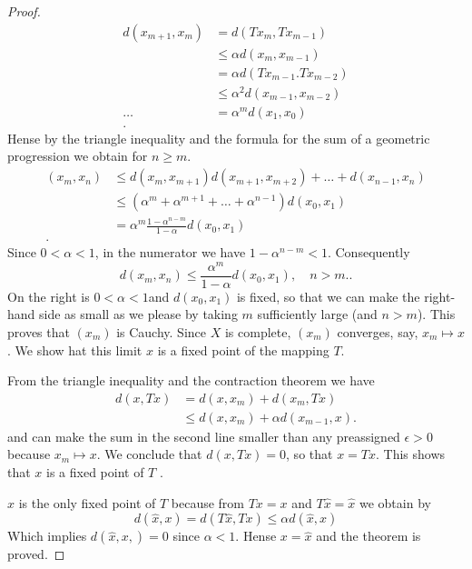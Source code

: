 \documentclass{article}
\theoremstyle{remark}
\begin{document}
\begin{proof}
  \begin{align}
    d\left( x_{m+1}, x_{m} \right) &= d\left( Tx_{m}, Tx_{m-1} \right) \\
    &\le \alpha d\left( x_{m}, x_{m-1} \right)  \\
    &= \alpha d\left( Tx_{m-1}. Tx_{m-2} \right) \\
    &\le \alpha ^{2} d\left( x_{m-1}, x_{m-2} \right) \\
    \ldots&= \alpha ^{m} d\left( x_1, x_0 \right) \\
  .\end{align}
  Hense by the triangle inequality and the formula for the sum of a geometric progression we obtain for $n\ge m$.
  \begin{align*}
    \left( x_{m}, x_{n} \right) &\le d\left( x_{m}, x_{m+1}  \right) d\left( x_{m+1}, x_{m+2} \right) +  \ldots  + d\left( x_{n-1}, x_{n} \right) \\
  &\le \left( \alpha ^{m} + \alpha ^{m+1} + \ldots + \alpha ^{n-1}  \right) d\left( x_0, x_1 \right)  \\
  &= \alpha ^{m} \frac{1- \alpha ^{n-m}}{1- \alpha } d\left( x_0, x_1 \right) \\
  .\end{align*}
  Since $0 < \alpha  <1 $, in the numerator we have $1 - \alpha ^{n-m} < 1 $. Consequently
  \begin{equation}
  \label{eq:fp_3}
  d\left( x_{m}, x_{n} \right) \le \frac{\alpha ^{m}}{1- \alpha } d\left( x_0, x_1 \right), \quad n>m. 
  .\end{equation}
  On the right is $0< \alpha  < 1$and $d\left( x_0,x_1 \right) $ is fixed, so that we can make the right-hand side as small as we please by taking $m$ sufficiently large (and $n>m$). This proves that $\left( x_{m} \right)$ is Cauchy. Since $X$ is complete, $\left( x_{m} \right)$ converges, say, $x_{m} \mapsto x$. We show hat this limit $x$ is a fixed point of the mapping $T$.
  \par
  From the triangle inequality and the contraction theorem  we have
  \begin{align}
    d\left( x,Tx \right) &= d\left( x,x_{m} \right) +  d\left( x_{m}, Tx \right) \\
    &\le d\left( x, x_{m} \right) +  \alpha d\left( x_{m-1}, x \right) 
  .\end{align}
  and can make the sum in the second line smaller than any preassigned $\epsilon > 0$ because $x_{m} \mapsto x$. We conclude that $d\left( x,Tx \right) = 0$, so that $x=Tx$. This shows that $x$ is a fixed point of $T$ . 
  \par
  $x $ is the only fixed point of $T$ because from $Tx= x$ and $T\hat{x} = \hat{x}$ we obtain by \[
    d\left( \hat{x}, x \right) = d\left( T \hat{x}, Tx \right) \le \alpha d\left( \hat{x}, x \right)
  \] 
  Which implies $d\left( \hat{x}, x, \right) = 0$ since $\alpha  < 1 $. Hense $x = \hat{x}$ and the theorem is proved. 
   
  


\end{proof}
\end{document}
